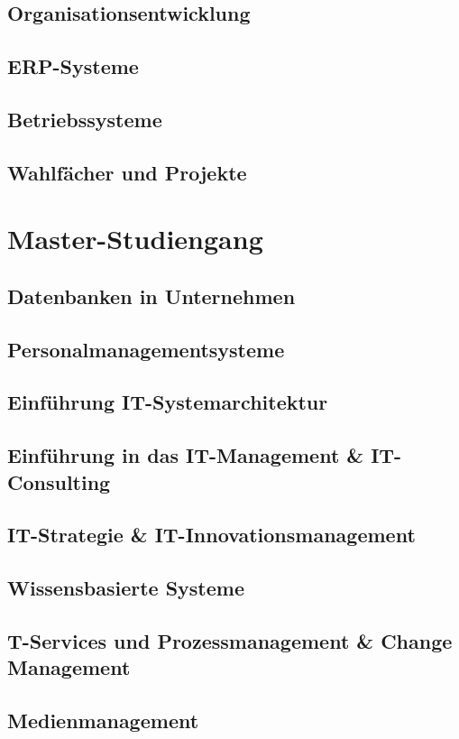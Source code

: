 \documentclass{hswbook}
\begin{document}
    \chapter{Organisationsentwicklung}    
    \chapter{ERP-Systeme}
    \chapter{Betriebssysteme}    
    \chapter{Wahlfächer und Projekte}

%
%
%
\part{Master-Studiengang}
    \chapter{Datenbanken in Unternehmen}
    \chapter{Personalmanagementsysteme}
    \chapter{Einführung IT-Systemarchitektur}
    \chapter{Einführung in das IT-Management \& IT-Consulting}
    \chapter{IT-Strategie \& IT-Innovationsmanagement }
    \chapter{Wissensbasierte Systeme}
    \chapter{T-Services und Prozessmanagement \& Change Management}
    \chapter{Medienmanagement}
\end{document}
